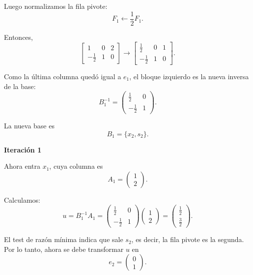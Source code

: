 \begin{enumerate}
Luego normalizamos la fila pivote:
\begin{equation}
F_1 \leftarrow \frac{1}{2}F_1.
\end{equation}

Entonces,
\begin{equation}
\left[
\begin{array}{cc|c}
1 & 0 & 2\\
-\frac{1}{2} & 1 & 0
\end{array}
\right]
\longrightarrow
\left[
\begin{array}{cc|c}
\frac{1}{2} & 0 & 1\\
-\frac{1}{2} & 1 & 0
\end{array}
\right].
\end{equation}

Como la última columna quedó igual a $e_1$, el bloque izquierdo es la nueva
inversa de la base:
\begin{equation}
B_1^{-1}
=
\begin{pmatrix}
\frac{1}{2} & 0\\
-\frac{1}{2} & 1
\end{pmatrix}.
\end{equation}

La nueva base es
\begin{equation}
B_1=\{x_2,s_2\}.
\end{equation}

\textbf{Iteración 1}

Ahora entra $x_1$, cuya columna es
\begin{equation}
A_1=
\begin{pmatrix}
1\\
2
\end{pmatrix}.
\end{equation}

Calculamos:
\begin{equation}
u=B_1^{-1}A_1
=
\begin{pmatrix}
\frac{1}{2} & 0\\
-\frac{1}{2} & 1
\end{pmatrix}
\begin{pmatrix}
1\\
2
\end{pmatrix}
=
\begin{pmatrix}
\frac{1}{2}\\
\frac{3}{2}
\end{pmatrix}.
\end{equation}

El test de razón mínima indica que sale $s_2$, es decir, la fila pivote es la
segunda. Por lo tanto, ahora se debe transformar $u$ en
\begin{equation}
e_2=
\begin{pmatrix}
0\\
1
\end{pmatrix}.
\end{equation}


\end{enumerate}

